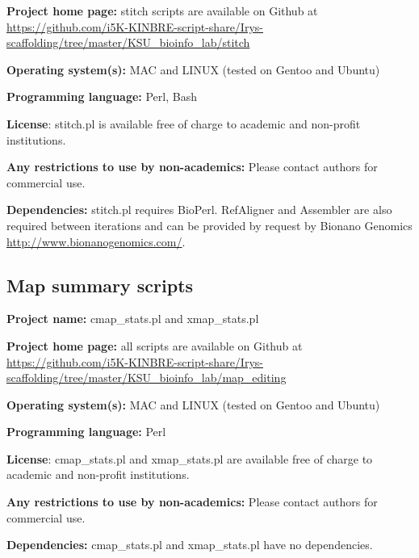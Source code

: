 \documentclass{bmcart}
\begin{document}
\textbf{Project home page:} stitch scripts are available on Github at \url{https://github.com/i5K-KINBRE-script-share/Irys-scaffolding/tree/master/KSU\_bioinfo\_lab/stitch}

\textbf{Operating system(s):} MAC and LINUX (tested on Gentoo and Ubuntu)

\textbf{Programming language:} Perl, Bash

\textbf{License}: stitch.pl is available free of charge to academic and non-profit institutions.

\textbf{Any restrictions to use by non-academics:} Please contact authors for commercial use.

\textbf{Dependencies:} stitch.pl requires BioPerl. RefAligner and Assembler are also required between iterations and can be provided by request by Bionano Genomics \url{http://www.bionanogenomics.com/}.

\subsection*{\textbf{Map summary scripts}}

\textbf{Project name:} cmap\_stats.pl and xmap\_stats.pl

\textbf{Project home page:} all scripts are available on Github at \url{https://github.com/i5K-KINBRE-script-share/Irys-scaffolding/tree/master/KSU\_bioinfo\_lab/map\_editing}

\textbf{Operating system(s):} MAC and LINUX (tested on Gentoo and Ubuntu)

\textbf{Programming language:} Perl

\textbf{License}: cmap\_stats.pl and xmap\_stats.pl are available free of charge to academic and non-profit institutions.

\textbf{Any restrictions to use by non-academics:} Please contact authors for commercial use.

\textbf{Dependencies:} cmap\_stats.pl and xmap\_stats.pl have no dependencies.

\end{document}
